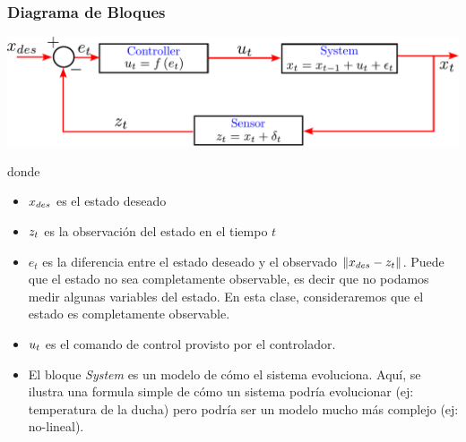 \begin{frame}
    \frametitle{Diagrama de Bloques}
    
    \begin{center}
        \includegraphics[width=0.8\columnwidth]{images/feedback_control_math.pdf}
    \end{center}
    
    donde
    \begin{itemize}
        \item $x_{des}$ es el estado deseado
        \item $z_{t}$  es la observación del estado en el tiempo $t$
        \item $e_{t}$ es la diferencia entre el estado deseado y el observado $\lVert x_{des} - z_{t}\rVert$. Puede que el estado no sea completamente observable, es decir que no podamos medir algunas variables del estado. En esta clase, consideraremos que el estado es completamente observable.
        \item $u_{t}$ es el comando de control provisto por el controlador.
        \item El bloque \emph{System} es un modelo de cómo el sistema evoluciona. Aquí, se ilustra una formula simple de cómo un sistema podría evolucionar (ej: temperatura de la ducha) pero podría ser un modelo mucho más complejo (ej: no-lineal).
    \end{itemize}
    
    
    
    
\end{frame}

